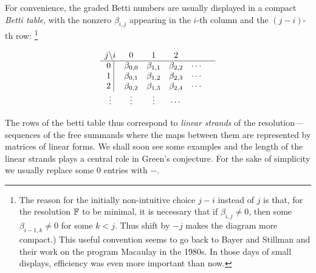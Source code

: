 For convenience, the graded Betti numbers are usually displayed in a compact \emph{Betti table}, with the nonzero $\beta_{i,j}$ appearing in the $i$-th column and the $(j-i)$-th row: \footnote{The reason for the initially non-intuitive choice $j-i$ instead of $j$ is that, for the resolution $\FF$ to be minimal, it is necessary that if $\beta_{i,j}\neq 0$, then some $\beta_{i-1,k}\neq 0$ for some $k<j$. Thus shift by $-j$ makes the diagram more compact.) This useful convention seems to go back to Bayer and Stillman and their work on the program Macaulay in the 1980s. In those days of small displays, efficiency was even more important than now.}
\setcounter{MaxMatrixCols}{13}
\begin{small}
$$
\begin{matrix}
j \backslash i     &0&1&2\\ \hline
\text{0 }\vline &\gb_{0,0}&\gb_{1,1}&\gb_{2,2}&\cdots&\\
\text{1 }\vline &\gb_{0,1}&\gb_{1,2}&\gb_{2,3}&\cdots&\\
\text{2 }\vline &\gb_{0,2}&\gb_{1,3}&\gb_{2,4}&\cdots&\\
\vdots&\vdots&\vdots&\cdots&\\
\end{matrix}
$$
\end{small}
The rows of the betti table thus correspond to \emph{linear strands} of the resolution---sequences of the free summands where the maps between them are represented by matrices of linear forms. We shall soon see some examples and the length of the linear strands plays a central role in Green's conjecture. For the sake of simplicity we usually replace some 0 entries with $-$.


